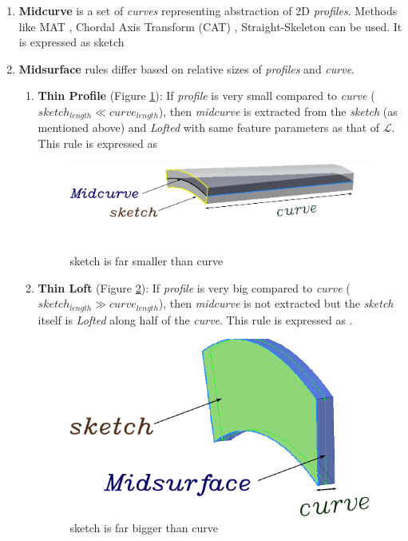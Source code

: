 \begin{enumerate}

\item {\bf Midcurve} is a set of {\em curves} representing abstraction of 2D {\em profiles}.	Methods like MAT \cite{Ramanathan2004}, Chordal Axis Transform (CAT) \cite{Quadros2008}, Straight-Skeleton \cite{Haunert2004} can be used. It is expressed as 	 {sketch} 

\item {\bf Midsurface} rules differ based on relative sizes of {\em profiles} and {\em curve}.
\begin{enumerate}
\item {\bf Thin Profile}  (Figure \ref{figure_MidsurfSmallProfile}): If {\em profile} is very small compared to {\em curve} ( $sketch_{length} \ll curve_{length}$), then {\em midcurve} is extracted from the {\em sketch} (as mentioned above) and {\em Lofted} with same feature parameters as that of  {\bf $\mathcal{L}$}. This rule is expressed as  

\begin{figure}[htbp]
\centering \includegraphics[scale=0.40]{../Common/images//MidsurfSmallProfile.pdf} 
\caption{sketch is far smaller than curve}
\label{figure_MidsurfSmallProfile}
\end{figure}

\item {\bf Thin Loft}  (Figure \ref{figure_MidsurfSmallCurve}):  If {\em profile} is very big compared to {\em curve} ($sketch_{length} \gg curve_{length}$), then {\em midcurve} is not extracted  but the {\em sketch} itself is {\em Lofted} along half of the {\em curve}. This rule is expressed as .

\begin{figure}[htbp]
\centering \includegraphics[scale=0.40]{../Common/images//MidsurfSmallCurve.pdf}
\caption{sketch is far bigger than curve}
\label{figure_MidsurfSmallCurve}
\end{figure}


\end{enumerate}
\end{enumerate}
